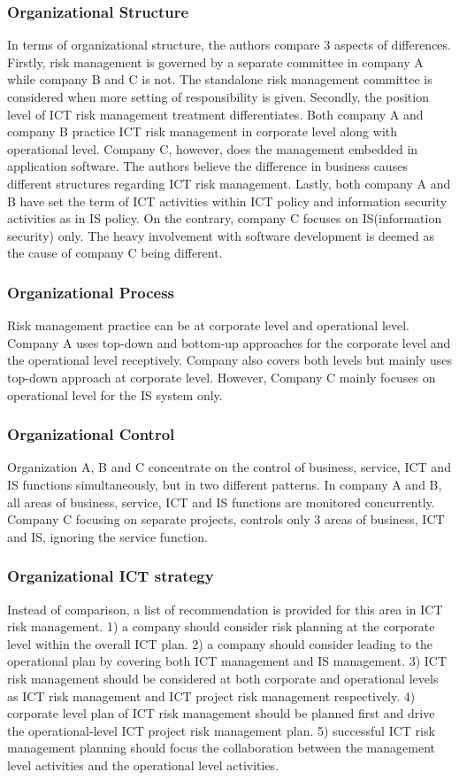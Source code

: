 \subsubsection{Organizational Structure}
In terms of organizational structure, the authors compare 3 aspects of differences. Firstly, risk management is governed by a separate committee in company A while company B and C is not. The standalone risk management committee is considered when more setting of responsibility is given. Secondly, the position level of ICT risk management treatment differentiates. Both company A and company B practice ICT risk management in corporate level along with operational level. Company C, however, does the management embedded in application software. The authors believe the difference in business causes different structures regarding ICT risk management. Lastly, both company A and B have set the term of ICT activities within ICT policy and information security activities as in IS policy. On the contrary, company C focuses on IS(information security) only. The heavy involvement with software development is deemed as the cause of company C being different.

\subsubsection{Organizational Process}
Risk management practice can be at corporate level and operational level. Company A uses top-down and bottom-up approaches for the corporate level and the operational level receptively. Company also covers both levels but mainly uses top-down approach at corporate level. However, Company C mainly focuses on operational level for the IS system only.

\subsubsection{Organizational Control}
Organization A, B and C concentrate on the control of business, service, ICT and IS functions simultaneously, but in two different patterns. In company A and B, all areas of business, service, ICT and IS functions are monitored concurrently. Company C focusing on separate projects, controls only 3 areas of business, ICT and IS, ignoring the service function.

\subsubsection{Organizational ICT strategy}
Instead of comparison, a list of recommendation is provided for this area in ICT risk management. 1) a company should consider risk planning at the corporate level within the overall ICT plan. 2) a company should consider leading to the operational plan by covering both ICT management and IS management. 3) ICT risk management should be considered at both corporate and operational levels as ICT risk management and ICT project risk management respectively. 4) corporate level plan of ICT risk management should be planned first and drive the operational-level ICT project risk management plan. 5) successful ICT risk management planning should focus the collaboration between the management level activities and the operational level activities.

